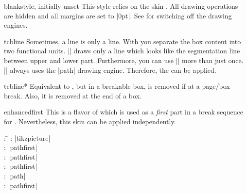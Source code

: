 \begin{docTcbKey}{blank}{}{style, initially unset}
  This style relies on the skin . All drawing operations
  are hidden and all margins are set to |0pt|. See 
  for switching off the drawing engines.
\begin{dispExample}
\begin{tcolorbox}[blank,watermark text=A blank box]
\lipsum[1]
\end{tcolorbox}
\end{dispExample}
\end{docTcbKey}

\clearpage
\begin{docCommand}{tcbline}{}
  Sometimes, a line is only a line. With  you separate
  the box content into two functional units. |\tcbline| draws only a line
  which looks like the segmentation line between upper and lower part.
  Furthermore, you can use |\tcbline| more than just once.
  |\tcbline| always uses the |path| drawing engine. Therefore,
  the  can be applied.

\begin{dispExample}

\begin{tcolorbox}[colupper=red!50!black,collower=green!50!black]
\lipsum[1]
\tcbline
\lipsum[2]
\tcblower
\lipsum[3]
\tcbline
\lipsum[4]
\end{tcolorbox}
\end{dispExample}
\end{docCommand}

\begin{docCommand}{tcbline*}{}
  Equivalent to , but in a breakable box, 
  is removed if at a page/box break. Also, it is removed at the end
  of a box.
\end{docCommand}

\clearpage
\begin{docSkin}{enhancedfirst}
This is a flavor of  which is used as a \emph{first} part
in a break sequence for .
Nevertheless, this skin can be applied independently.
\begin{tcolorbox}[skintable=enhancedfirst]
  \begin{tabbing}
    : \=\kill
    :  \> |tikzpicture|\\ 
    :           \> |pathfirst|\\
    : \> |pathfirst|\\ 
    :        \> |pathfirst|\\
    :    \> |path|\\
    :           \> |pathfirst|
  \end{tabbing}
\end{tcolorbox}
\end{docSkin}


